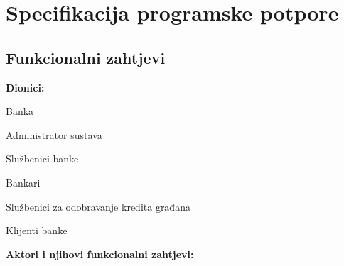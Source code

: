 \chapter{Specifikacija programske potpore}
		
	\section{Funkcionalni zahtjevi}
			
			
			\noindent \textbf{Dionici:}
			
			\begin{packed_enum}
				
				\item Banka
				\item Administrator sustava
				\item Službenici banke
				\begin{packed_enum}
					\item Bankari
					\item Službenici za odobravanje kredita građana
				\end{packed_enum}
				\item Klijenti banke
				
			\end{packed_enum}
			
			\noindent \textbf{Aktori i njihovi funkcionalni zahtjevi:}
			
